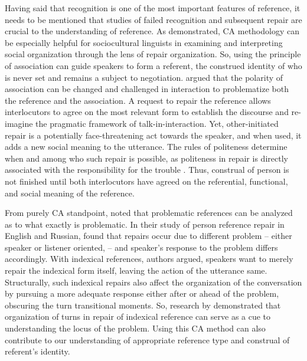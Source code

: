 \documentclass[12pt, draft]{article}
\begin{document}
Having said that recognition is one of the most important features of reference, it needs to be mentioned that studies of failed recognition and subsequent repair are crucial to the understanding of reference. As \textcite{sidnell2008} demonstrated, CA methodology can be especially helpful for sociocultural linguists in examining and interpreting social organization through the lens of repair organization. So, using the principle of association can guide speakers to form a referent, the construed identity of who is never set and remains a subject to negotiation. \textcite{blythe2009} argued that the polarity of association can be changed and challenged in interaction to problematize both the reference and the association. A request to repair the reference allows interlocutors to agree on the most relevant form to establish the discourse and re-imagine the pragmatic framework of talk-in-interaction. Yet, other-initiated repair is a potentially face-threatening act towards the speaker, and when used, it adds a new social meaning to the utterance. The rules of politeness determine when and among who such repair is possible, as politeness in repair is directly associated with the responsibility for the trouble \parencite{sidnell2008}. Thus, construal of person is not finished until both interlocutors have agreed on the referential, functional, and social meaning of the reference.

From purely CA standpoint, \textcite{bolden2012} noted that problematic references can be analyzed as to what exactly is problematic. In their study of person reference repair in English and Russian, \textcite{bolden2012} found that repairs occur due to different problem -- either speaker or listener oriented, -- and speaker's response to the problem differs accordingly. With indexical references, authors argued, speakers want to merely repair the indexical form itself, leaving the action of the utterance same. Structurally, such indexical repairs also affect the organization of the conversation by pursuing a more adequate response either after or ahead of the problem, obscuring the turn transitional moments. So, research by \textcite{bolden2012} demonstrated that organization of turns in repair of indexical reference can serve as a cue to understanding the locus of the problem. Using this CA method can also contribute to our understanding of appropriate reference type and construal of referent's identity.
\end{document}
